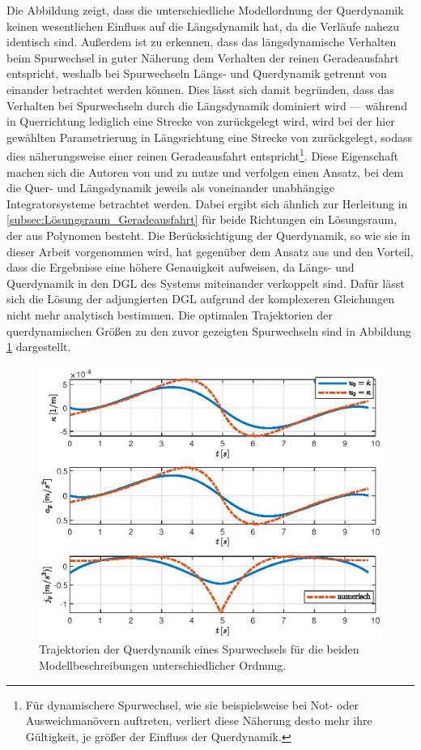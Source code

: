 Die Abbildung zeigt, dass die unterschiedliche Modellordnung der Querdynamik keinen wesentlichen Einfluss auf die Längsdynamik hat, da die Verläufe nahezu identisch sind. Außerdem ist zu erkennen, dass das längsdynamische Verhalten beim Spurwechsel in guter Näherung dem Verhalten der reinen Geradeausfahrt entspricht, weshalb bei Spurwechseln Längs- und Querdynamik getrennt von einander betrachtet werden können. Dies lässt sich damit begründen, dass das Verhalten bei Spurwechseln durch die Längsdynamik dominiert wird --- während in Querrichtung lediglich eine Strecke von  zurückgelegt wird, wird bei der hier gewählten Parametrierung in Längsrichtung eine Strecke von  zurückgelegt, sodass dies näherungsweise einer reinen Geradeausfahrt entspricht\footnote{Für dynamischere Spurwechsel, wie sie beispielsweise bei Not- oder Ausweichmanövern auftreten, verliert diese Näherung desto mehr ihre Gültigkeit, je größer der Einfluss der Querdynamik.}. Diese Eigenschaft machen sich die Autoren von \cite{Rathgeber.2016} und \cite{Werling.2011} zu nutze und verfolgen einen Ansatz, bei dem die Quer- und Längsdynamik jeweils als voneinander unabhängige Integratorsysteme betrachtet werden. Dabei ergibt sich ähnlich zur Herleitung in \ref{subsec:Lösungsraum_Geradeausfahrt} für beide Richtungen ein Lösungsraum, der aus Polynomen besteht. Die Berücksichtigung der Querdynamik, so wie sie in dieser Arbeit vorgenommen wird, hat gegenüber dem Ansatz aus \cite{Rathgeber.2016} und \cite{Werling.2011} den Vorteil, dass die Ergebnisse eine höhere Genauigkeit aufweisen, da Längs- und Querdynamik in den \gls{DGL} des Systems miteinander verkoppelt sind. Dafür lässt sich die Lösung der adjungierten \gls{DGL} aufgrund der komplexeren Gleichungen nicht mehr analytisch bestimmen. Die optimalen Trajektorien der querdynamischen Größen zu den zuvor gezeigten Spurwechseln sind in Abbildung \ref{fig:lat_dyn_s300_v30_ohne_dkappa} dargestellt.
\begin{figure}[h] 
	\centering
	\includegraphics[width=\linewidth]{./Bilder/Ergebnisse/Geradeausfahrt/Spurwechsel/lat_dyn_s300_v30_ohne_dkappa.eps}
	\caption{Trajektorien der Querdynamik eines Spurwechsels für die beiden Modellbeschreibungen unterschiedlicher Ordnung.}
	\label{fig:lat_dyn_s300_v30_ohne_dkappa}
\end{figure} 

